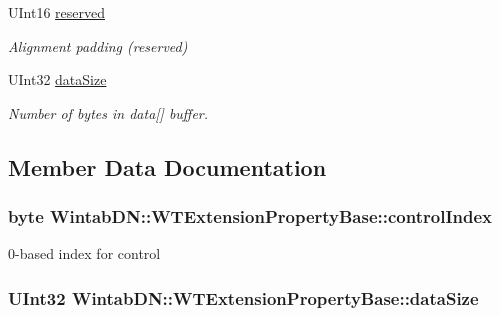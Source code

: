 \begin{DoxyCompactItemize}
UInt16 \hyperlink{struct_wintab_d_n_1_1_w_t_extension_property_base_ad91637900f8dcafba84a476539748dfd}{reserved}
\begin{DoxyCompactList}\small\item\em Alignment padding (reserved) \item\end{DoxyCompactList}\item 
UInt32 \hyperlink{struct_wintab_d_n_1_1_w_t_extension_property_base_a900ebf0601173296d292c3b10728530d}{dataSize}
\begin{DoxyCompactList}\small\item\em Number of bytes in data\mbox{[}\mbox{]} buffer. \item\end{DoxyCompactList}\end{DoxyCompactItemize}


\subsection{Member Data Documentation}
\hypertarget{struct_wintab_d_n_1_1_w_t_extension_property_base_a3af5bc46a6f7c1be248e7f34172f62eb}{
\subsubsection[{controlIndex}]{\setlength{\rightskip}{0pt plus 5cm}byte {\bf WintabDN::WTExtensionPropertyBase::controlIndex}}}
\label{struct_wintab_d_n_1_1_w_t_extension_property_base_a3af5bc46a6f7c1be248e7f34172f62eb}


0-\/based index for control 

\hypertarget{struct_wintab_d_n_1_1_w_t_extension_property_base_a900ebf0601173296d292c3b10728530d}{
\subsubsection[{dataSize}]{\setlength{\rightskip}{0pt plus 5cm}UInt32 {\bf WintabDN::WTExtensionPropertyBase::dataSize}}}
\label{struct_wintab_d_n_1_1_w_t_extension_property_base_a900ebf0601173296d292c3b10728530d}


